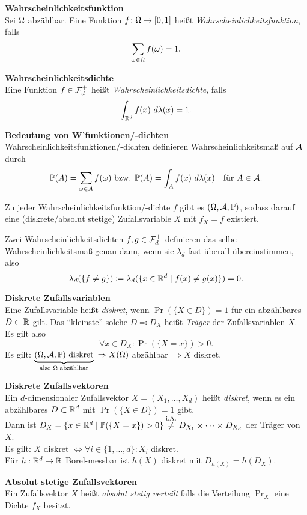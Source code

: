 \textbf{Wahrscheinlichkeitsfunktion}\\
Sei $\Omega$ abzählbar.
Eine Funktion $f\!: \Omega \to [0,1]$ heißt
\textit{Wahrscheinlichkeitsfunktion}, falls
\[
  \sum_{\omega\in\Omega} f(\omega) = 1.
\]

\textbf{Wahrscheinlichkeitsdichte}\\
Eine Funktion $f\in\mathcal{F}_d^+$ heißt \textit{Wahrscheinlichkeitsdichte},
falls
\[
  \int_{\mathbb{R}^d} f(x)~d\lambda(x) = 1.
\]

\textbf{Bedeutung von W'funktionen/-dichten}\\
Wahrscheinlichkeitsfunktionen/-dichten definieren Wahrscheinlichkeitsmaß auf
$\mathcal{A}$ durch
\[
  \mathbb{P}(A) = \sum_{\omega \in A} f(\omega) \text{ bzw. } \mathbb{P}(A) = \int_A f(x)~d\lambda(x)
  \quad \text{für } A\in\mathcal{A}.
\]

Zu jeder Wahrscheinlichkeitsfunktion/-dichte $f$ gibt es $(\Omega,\mathcal{A},\mathbb{P})$, sodass
darauf eine (diskrete/absolut stetige) Zufallsvariable $X$ mit
$f_X = f$ existiert.

Zwei Wahrscheinlichkeitsdichten $f,g\in\mathcal{F}_d^+$ definieren das selbe Wahrscheinlichkeitsmaß genau dann, wenn sie $\lambda_d$-fast-überall übereinstimmen, also
\[
  \lambda_d(\{f\neq g\})\coloneqq\lambda_d(\{x\in\mathbb{R}^d\mid f(x)\neq g(x)\})=0.
\]

\textbf{Diskrete Zufallsvariablen}\\
Eine Zufallsvariable heißt \textit{diskret}, wenn $\Pr(\{X \in D\}) = 1$
für ein abzählbares $D\subset\mathbb{R}$ gilt.
Das ``kleinste'' solche $D \eqqcolon D_X$ heißt \textit{Träger} der Zufallsvariablen $X$. Es gilt also
\[
  \forall x \in D_X\!: \Pr(\{X=x\}) > 0.
\]
Es gilt:
$\underbrace{(\Omega,\mathcal{A},\mathbb{P}) \text{ diskret}}_{\text{also $\Omega$ abzählbar}}$
$\Rightarrow X(\Omega)$ abzählbar $\Rightarrow X$ diskret.

\textbf{Diskrete Zufallsvektoren}\\
Ein $d$-dimensionaler Zufallsvektor $X = (X_1,\ldots,X_d)$ heißt \textit{diskret},
wenn es ein abzählbares $D\subset\mathbb{R}^d$ mit $\Pr(\{X \in D\}) = 1$ gibt.\\
Dann ist $D_X = \{x\in\mathbb{R}^d \mid \mathbb{P}(\{X=x\})>0\}
\overset{\text{i.A.}}{\neq} D_{X_1} \times\cdots\times D_{X_d}$
der Träger von $X$.\\
Es gilt: $X$ diskret $\Leftrightarrow \forall i\in\{1,\ldots,d\}\!: X_i$ diskret.\\
Für $h:\mathbb{R}^d\to\mathbb{R}$ Borel-messbar ist $h(X)$ diskret mit $D_{h(X)} = h(D_X)$.

\textbf{Absolut stetige Zufallsvektoren}\\
Ein Zufallsvektor $X$ heißt \textit{absolut stetig verteilt} falls die
Verteilung $\Pr_X$ eine Dichte $f_X$ besitzt.

